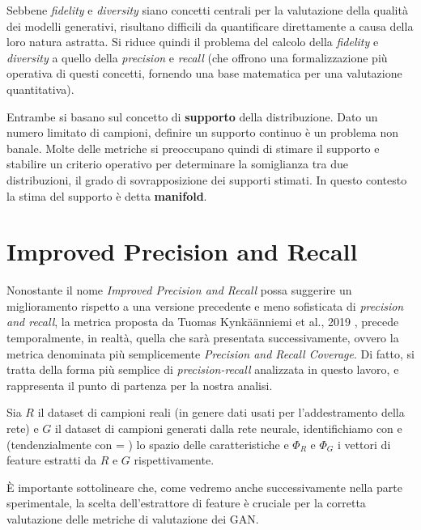 Sebbene \textit{fidelity} e \textit{diversity} siano concetti centrali per la valutazione della qualità dei modelli generativi, risultano difficili da quantificare direttamente a causa della loro natura astratta.
Si riduce quindi il problema del calcolo della \textit{fidelity} e \textit{diversity} a quello della \textit{precision} e \textit{recall} (che offrono una formalizzazione più operativa di questi concetti, fornendo una base matematica per una valutazione quantitativa).\

Entrambe si basano sul concetto di \textbf{supporto} della distribuzione. Dato un numero limitato di campioni, definire un supporto continuo è un problema non banale. 
Molte delle metriche si preoccupano quindi di stimare il supporto e stabilire un criterio operativo per determinare la somiglianza tra due distribuzioni, il grado di sovrapposizione dei supporti stimati.
In questo contesto la stima del supporto è detta \textbf{manifold}.

\section{Improved Precision and Recall}
\label{sec:improved-precision-and-recall}

Nonostante il nome \textit{Improved Precision and Recall} possa suggerire un miglioramento rispetto a una versione precedente e meno sofisticata di \textit{precision and recall}, 
la metrica proposta da Tuomas Kynkäänniemi et al., 2019 \cite{2ImprovedPrecisionRecall}, precede temporalmente, in realtà, quella che sarà presentata successivamente, ovvero la metrica denominata più semplicemente \textit{Precision and Recall Coverage}. 
Di fatto, si tratta della forma più semplice di \textit{precision-recall} analizzata in questo lavoro, e rappresenta il punto di partenza per la nostra analisi.

Sia \(R\) il dataset di campioni reali (in genere dati usati per l'addestramento della rete) e \(G\) il dataset di campioni generati dalla rete neurale, identifichiamo con  e  (tendenzialmente con  = ) lo spazio delle caratteristiche e \(\Phi_R\) e \(\Phi_G\) i vettori di feature estratti da \(R\) e \(G\) rispettivamente.

È importante sottolineare che, come vedremo anche successivamente nella parte sperimentale, la scelta dell'estrattore di feature è cruciale per la corretta valutazione delle metriche di valutazione dei GAN.


